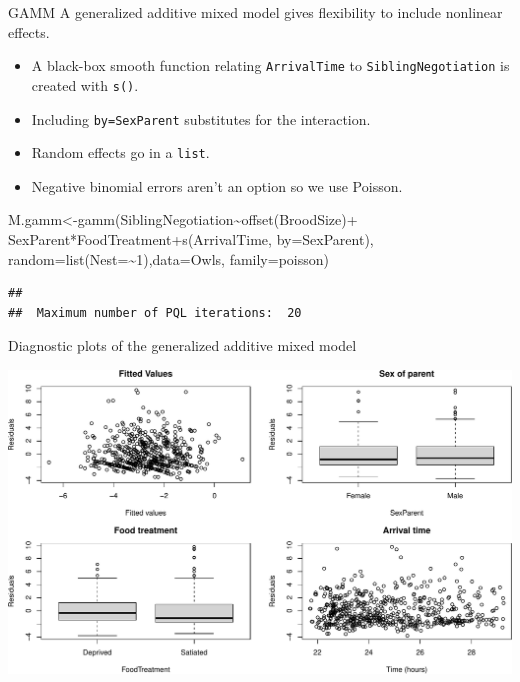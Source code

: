 \documentclass[
  ignorenonframetext,
]{beamer}
\newenvironment{Shaded}{\begin{snugshade}}{\end{snugshade}}
\newcommand{\AttributeTok}[1]{\textcolor[rgb]{0.77,0.63,0.00}{#1}}
\newcommand{\DecValTok}[1]{\textcolor[rgb]{0.00,0.00,0.81}{#1}}
\newcommand{\FunctionTok}[1]{\textcolor[rgb]{0.00,0.00,0.00}{#1}}
\newcommand{\NormalTok}[1]{#1}
\newcommand{\OtherTok}[1]{\textcolor[rgb]{0.56,0.35,0.01}{#1}}
\newcommand{\SpecialCharTok}[1]{\textcolor[rgb]{0.00,0.00,0.00}{#1}}
\providecommand{\tightlist}{%
  \setlength{\itemsep}{0pt}\setlength{\parskip}{0pt}}
\begin{document}
\begin{frame}[fragile]{GAMM}
\protect\hypertarget{gamm}{}
A generalized additive mixed model gives flexibility to include
nonlinear effects.

\begin{itemize}
\tightlist
\item
  A black-box smooth function relating \texttt{ArrivalTime} to
  \texttt{SiblingNegotiation} is created with \texttt{s()}.
\item
  Including \texttt{by=SexParent} substitutes for the interaction.
\item
  Random effects go in a \texttt{list}.
\item
  Negative binomial errors aren't an option so we use Poisson.
\end{itemize}

\scriptsize

\begin{Shaded}
\begin{Highlighting}[]
\NormalTok{M.gamm}\OtherTok{\textless{}{-}}\FunctionTok{gamm}\NormalTok{(SiblingNegotiation}\SpecialCharTok{\textasciitilde{}}\FunctionTok{offset}\NormalTok{(BroodSize)}\SpecialCharTok{+}
\NormalTok{                SexParent}\SpecialCharTok{*}\NormalTok{FoodTreatment}\SpecialCharTok{+}\FunctionTok{s}\NormalTok{(ArrivalTime, }\AttributeTok{by=}\NormalTok{SexParent),}
              \AttributeTok{random=}\FunctionTok{list}\NormalTok{(}\AttributeTok{Nest=}\SpecialCharTok{\textasciitilde{}}\DecValTok{1}\NormalTok{),}\AttributeTok{data=}\NormalTok{Owls,}
              \AttributeTok{family=}\NormalTok{poisson)}
\end{Highlighting}
\end{Shaded}

\begin{verbatim}
## 
##  Maximum number of PQL iterations:  20
\end{verbatim}
\end{frame}

\begin{frame}{Diagnostic plots of the generalized additive mixed model}
\protect\hypertarget{diagnostic-plots-of-the-generalized-additive-mixed-model}{}
\scriptsize

\includegraphics{mixed_models_files/figure-beamer/unnamed-chunk-28-1.pdf}
\end{frame}
\end{document}
